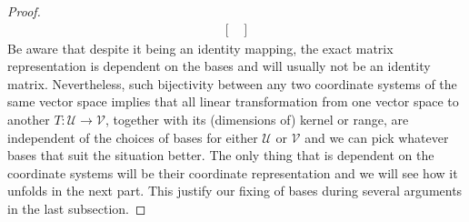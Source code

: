 \begin{proof}
\begin{align*}
\begin{bmatrix}
\end{bmatrix}
\end{align*}
Be aware that despite it being an identity mapping, the exact matrix representation is dependent on the bases and will usually not be an identity matrix. Nevertheless, such bijectivity between any two coordinate systems of the same vector space implies that all linear transformation from one vector space to another $T: \mathcal{U} \to \mathcal{V}$, together with its (dimensions of) kernel or range, are independent of the choices of bases for either $\mathcal{U}$ or $\mathcal{V}$ and we can pick whatever bases that suit the situation better. The only thing that is dependent on the coordinate systems will be their coordinate representation and we will see how it unfolds in the next part. This justify our fixing of bases during several arguments in the last subsection.
\end{proof}

